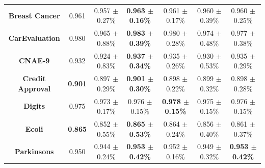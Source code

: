 \documentclass[preprint,12pt]{elsarticle}
\begin{document}
\begin{table}
{\begin{tabular}{ccccccc}
\textbf{Breast Cancer}          & 0.961                                 & 0.957 $\pm$ 0.27\%                                 & {\color[HTML]{FE0000} \textbf{0.963 $\pm$ 0.16\%}} & 0.961 $\pm$ 0.17\%                                 & 0.960 $\pm$ 0.39\%                                 & 0.960 $\pm$ 0.25\%                                 \\
\textbf{CarEvaluation}          & {\color[HTML]{FE0000} 0.980}          & 0.965 $\pm$ 0.88\%                                 & \textbf{0.983 $\pm$ 0.39\%}                        & 0.980 $\pm$ 0.28\%                                 & 0.974 $\pm$ 0.48\%                                 & 0.977 $\pm$ 0.38\%                                 \\
\textbf{CNAE-9}                 & 0.932                                 & 0.924 $\pm$ 0.83\%                                 & {\color[HTML]{FE0000} \textbf{0.937 $\pm$ 0.34\%}} & 0.935 $\pm$ 0.26\%                                 & 0.930 $\pm$ 0.53\%                                 & 0.935 $\pm$ 0.29\%                                 \\
\textbf{Credit   Approval}      & {\color[HTML]{FE0000} \textbf{0.901}} & 0.897 $\pm$ 0.29\%                                 & \textbf{0.901 $\pm$ 0.30\%}                        & 0.898 $\pm$ 0.22\%                                 & 0.899 $\pm$ 0.32\%                                 & 0.898 $\pm$ 0.28\%                                 \\
\textbf{Digits}                 & 0.975                                 & 0.973 $\pm$ 0.17\%                                 & 0.976 $\pm$ 0.15\%                                 & {\color[HTML]{FE0000} \textbf{0.978 $\pm$ 0.15\%}} & 0.975 $\pm$ 0.15\%                                 & 0.976 $\pm$ 0.15\%                                 \\
\textbf{Ecoli}                  & {\color[HTML]{FE0000} \textbf{0.865}} & 0.852 $\pm$ 0.55\%                                 & \textbf{0.865 $\pm$ 0.53\%}                        & 0.864 $\pm$ 0.24\%                                 & 0.856 $\pm$ 0.40\%                                 & 0.861 $\pm$ 0.37\%                                 \\
\textbf{Parkinsons}             & {\color[HTML]{FE0000} 0.950}          & 0.944 $\pm$ 0.24\%                                 & \textbf{0.953 $\pm$ 0.42\%}                        & 0.952 $\pm$ 0.16\%                                 & 0.949 $\pm$ 0.32\%                                 & \textbf{0.953 $\pm$ 0.42\%}                        \\

\end{tabular}}
\end{table}
\end{document}
